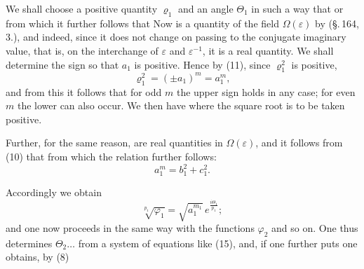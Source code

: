 We shall choose a positive quantity $\varrho_1$ and an angle $\Theta_1$ in such
a way that
or
from which it further follows that
Now
is a quantity of the field $\Omega(\varepsilon)$ by (\S.\,164, 3.), and indeed,
since it does not change on passing to the conjugate imaginary value,
that is, on the interchange of $\varepsilon$ and $\varepsilon^{-1}$, it is a
real quantity. We shall determine the sign so that $a_1$ is
positive. Hence by (11), since $\varrho_1^2$ is positive,
\[
\varrho_1^2 = (\pm a_1)^m = a_1^m,
\]
and from this it follows that for odd $m$ the upper sign
holds in any case; for even $m$ the lower can also occur. We then have
where the square root is to be taken positive.

Further, for the same reason,
are real quantities in $\Omega(\varepsilon)$, and it follows from (10) that
from which the relation further follows:
\[
a_1^m = b_1^2 + c_1^2.
\]

Accordingly we obtain
\[
\sqrt[p_1]{\varphi_1} = \sqrt{a_1^{m_1}}\, e^{\frac{i\Theta_1}{p_1}};
\]
and one now proceeds in the same way with the functions $\varphi_2$ and so on.
One thus determines $\Theta_2 \ldots$ from a system of equations
like (15), and, if one further puts
one obtains, by (8)
